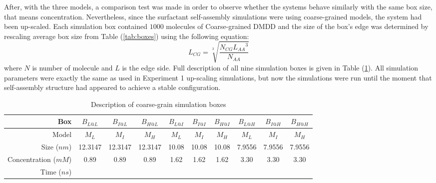 \documentclass[10pt,a4paper,twoside]{article}
\begin{document}
  After, with the three models, a comparison test was made in order to observe whether the systems behave similarly with the same box size, that means concentration. Nevertheless, since the surfactant self-assembly simulations were using coarse-grained models, the system had been up-scaled. Each simulation box contained $1000$ molecules of Coarse-grained DMDD and the size of the box's edge was determined by rescaling average box size from Table (\ref{tab:boxes}) using the following equation:  
\begin{equation}
L_{CG}=\sqrt[3]{\frac{N_{CG} {L_{AA}}^3}{N_{AA}}}
\label{eqn:bsize}
\end{equation}
where $N$ is number of molecule and $L$ is the edge side. Full description of all nine simulation boxes is given in Table (\ref{tab:cgbox}). All simulation parameters were exactly the same as used in Experiment 1 up-scaling simulations, but now the simulations were run until the moment that self-assembly structure had appeared to achieve a stable configuration.
\begin{table}[ht!] 
  \centering
\begin{threeparttable}

  \caption{Description of coarse-grain simulation boxes}

\begin{tabular}{|r|c|c|c||c|c|c||c|c|c|}
\hline
Box                  & $B_{L@L}$ & $B_{I@L}$ & $B_{H@L}$ & $B_{L@I}$ & $B_{I@I}$ & $B_{H@I}$ & $B_{L@H}$ & $B_{I@H}$ & $B_{H@H}$ \\ \hline
Model                &     $M_{L}$      &   $M_{I}$       &      $M_{H}$     &     $M_{L}$      &     $M_{I}$      &       $M_{H}$    &      $M_{L}$     &   $M_{I}$        &     $M_{H}$      \\ \hline
Size ($nm$)          &     12.3147      &      12.3147      &     12.3147      &     10.08      &      10.08          &      10.08          &      7.9556     &     7.9556     &     7.9556      \\ \hline
Concentration ($mM$) &     0.89      &     0.89      &    0.89       &    1.62       &          1.62 &     1.62      &    3.30       &     3.30      &     3.30      \\ \hline
Time ($ns$)          &           &           &           &           &           &           &           &           &           \\ \hline
\end{tabular}
  \label{tab:cgbox}%
\end{threeparttable} 
\end{table}
\end{document}
